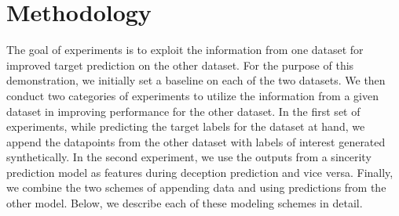\documentclass{article}
\begin{document}
\section{Methodology}

The goal of experiments is to exploit the information from one dataset for improved target prediction on the other dataset.
For the purpose of this demonstration, we initially set a baseline on each of the two datasets.
We then conduct two categories of experiments to utilize the information from a given dataset in improving performance for the other dataset. 
In the first set of experiments, while predicting the target labels for the dataset at hand, we append the datapoints from the other dataset with labels of interest generated synthetically. 
In the second experiment, we use the outputs from a sincerity prediction model as features during deception prediction and vice versa.
Finally, we combine the two schemes of appending data and using predictions from the other model.
Below, we describe each of these modeling schemes in detail. 
\end{document}
